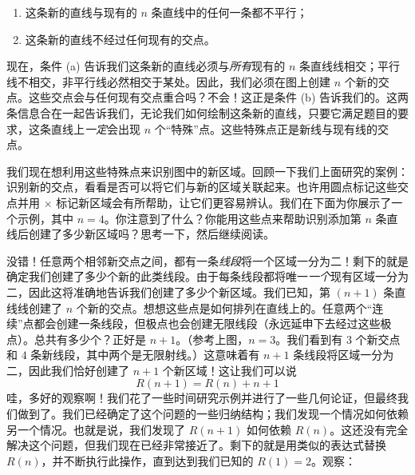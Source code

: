 \begin{enumerate}[label=(\alph*)]
    \item 这条新的直线与现有的 $n$ 条直线中的任何一条都不平行；
    \item 这条新的直线不经过任何现有的交点。
\end{enumerate}

现在，条件 (a) 告诉我们这条新的直线必须与\textit{所有}现有的 $n$ 条直线线相交；平行线不相交，非平行线必然相交于某处。因此，我们必须在图上创建 $n$ 个新的交点。这些交点会与任何现有交点重合吗？不会！这正是条件 (b) 告诉我们的。这两条信息合在一起告诉我们，无论我们如何绘制这条新的直线，只要它满足题目的要求，这条直线上\textit{一定}会出现 $n$ 个“特殊”点。这些特殊点正是新线与现有线的交点。

我们现在想利用这些特殊点来识别图中的新区域。回顾一下我们上面研究的案例：识别新的交点，看看是否可以将它们与新的区域关联起来。也许用圆点标记这些交点并用 $\textbf{×}$ 标记新区域会有所帮助，让它们更容易辨认。我们在下面为你展示了一个示例，其中 $n = 4$。你注意到了什么？你能用这些点来帮助识别添加第 $n$ 条直线后创建了多少新区域吗？思考一下，然后继续阅读。

\begin{center}
\end{center}

没错！任意两个相邻新交点之间，都有一条\textit{线段}将一个区域一分为二！剩下的就是确定我们创建了多少个新的此类线段。由于每条线段都将唯一\textit{一个}现有区域一分为二，因此这将准确地告诉我们创建了多少个新区域。我们已知，第 $(n + 1)$ 条直线线创建了 $n$ 个新的交点。想想这些点是如何排列在直线上的。任意两个“连续”点都会创建一条线段，但极点也会创建无限线段（永远延申下去经过这些极点）。总共有多少个？正好是 $n + 1$。（参考上图，$n = 3$。我们看到有 $3$ 个新交点和 $4$ 条新线段，其中两个是无限射线。）这意味着有 $n + 1$ 条线段将区域一分为二，因此我们恰好创建了 $n + 1$ 个新区域！这让我们可以说
\[R(n + 1) = R(n) + n + 1\]
哇，多好的观察啊！我们花了一些时间研究示例并进行了一些几何论证，但最终我们做到了。我们已经确定了这个问题的一些归纳结构；我们发现一个情况如何依赖另一个情况。也就是说，我们发现了 $R(n+1)$ 如何依赖 $R(n)$。这还没有完全解决这个问题，但我们现在已经非常接近了。剩下的就是用类似的表达式替换 $R(n)$，并不断执行此操作，直到达到我们已知的 $R(1) = 2$。观察：

